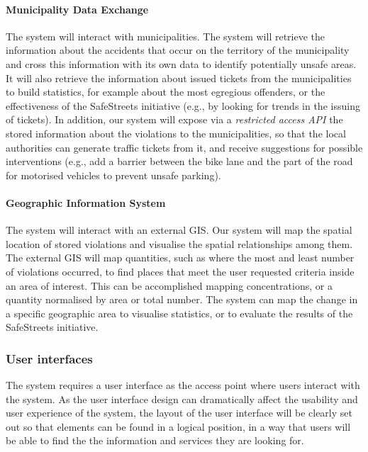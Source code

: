 \paragraph{Municipality Data Exchange} The system will interact with municipalities. The system will retrieve the information about the accidents that occur on the territory of the municipality and cross this information with its own data to identify potentially unsafe areas. It will also retrieve the information about issued tickets from the municipalities to build statistics, for example about the most egregious offenders, or the effectiveness of the SafeStreets initiative (e.g., by looking for trends in the issuing of tickets). In addition, our system will expose via a \emph{restricted access API} the stored information about the violations to the municipalities, so that the local authorities can generate traffic tickets from it, and receive suggestions for possible interventions (e.g., add a barrier between the bike lane and the part of the road for motorised vehicles to prevent unsafe parking). 
		
\paragraph{Geographic Information System} The system will interact with an external GIS. Our system will map the spatial location of stored violations and visualise the spatial relationships among them. The external GIS will map quantities, such as where the most and least number of violations occurred, to find places that meet the user requested criteria inside an area of interest. This can be accomplished mapping concentrations, or a quantity normalised by area or total number. The system can map the change in a specific geographic area to visualise statistics, or to evaluate the results of the SafeStreets initiative.	

\subsubsection{User interfaces}

The system requires a user interface as the access point where users interact with the system. As the user interface design can dramatically affect the usability and user experience of the system, the layout of the user interface will be clearly set out so that elements can be found in a logical position, in a way that users will be able to find the the information and services they are looking for.

